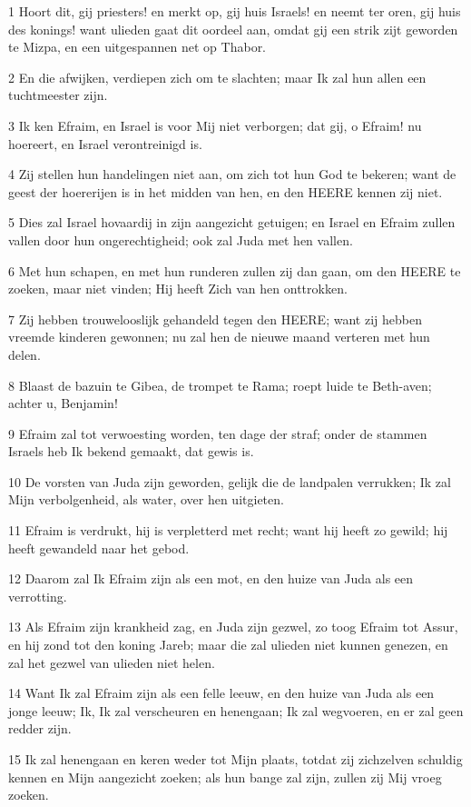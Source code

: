 \par 1 Hoort dit, gij priesters! en merkt op, gij huis Israels! en neemt ter oren, gij huis des konings! want ulieden gaat dit oordeel aan, omdat gij een strik zijt geworden te Mizpa, en een uitgespannen net op Thabor.
\par 2 En die afwijken, verdiepen zich om te slachten; maar Ik zal hun allen een tuchtmeester zijn.
\par 3 Ik ken Efraim, en Israel is voor Mij niet verborgen; dat gij, o Efraim! nu hoereert, en Israel verontreinigd is.
\par 4 Zij stellen hun handelingen niet aan, om zich tot hun God te bekeren; want de geest der hoererijen is in het midden van hen, en den HEERE kennen zij niet.
\par 5 Dies zal Israel hovaardij in zijn aangezicht getuigen; en Israel en Efraim zullen vallen door hun ongerechtigheid; ook zal Juda met hen vallen.
\par 6 Met hun schapen, en met hun runderen zullen zij dan gaan, om den HEERE te zoeken, maar niet vinden; Hij heeft Zich van hen onttrokken.
\par 7 Zij hebben trouwelooslijk gehandeld tegen den HEERE; want zij hebben vreemde kinderen gewonnen; nu zal hen de nieuwe maand verteren met hun delen.
\par 8 Blaast de bazuin te Gibea, de trompet te Rama; roept luide te Beth-aven; achter u, Benjamin!
\par 9 Efraim zal tot verwoesting worden, ten dage der straf; onder de stammen Israels heb Ik bekend gemaakt, dat gewis is.
\par 10 De vorsten van Juda zijn geworden, gelijk die de landpalen verrukken; Ik zal Mijn verbolgenheid, als water, over hen uitgieten.
\par 11 Efraim is verdrukt, hij is verpletterd met recht; want hij heeft zo gewild; hij heeft gewandeld naar het gebod.
\par 12 Daarom zal Ik Efraim zijn als een mot, en den huize van Juda als een verrotting.
\par 13 Als Efraim zijn krankheid zag, en Juda zijn gezwel, zo toog Efraim tot Assur, en hij zond tot den koning Jareb; maar die zal ulieden niet kunnen genezen, en zal het gezwel van ulieden niet helen.
\par 14 Want Ik zal Efraim zijn als een felle leeuw, en den huize van Juda als een jonge leeuw; Ik, Ik zal verscheuren en henengaan; Ik zal wegvoeren, en er zal geen redder zijn.
\par 15 Ik zal henengaan en keren weder tot Mijn plaats, totdat zij zichzelven schuldig kennen en Mijn aangezicht zoeken; als hun bange zal zijn, zullen zij Mij vroeg zoeken.

